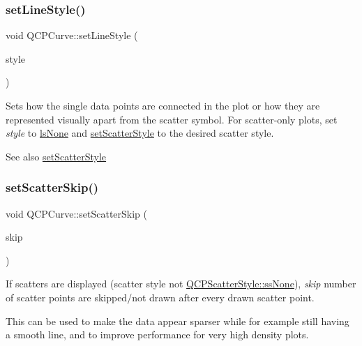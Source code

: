 \subsubsection{\texorpdfstring{set\+Line\+Style()}{setLineStyle()}}
{\footnotesize\ttfamily void Q\+C\+P\+Curve\+::set\+Line\+Style (\begin{DoxyParamCaption}\item[{\mbox{\hyperlink{class_q_c_p_curve_a2710e9f79302152cff794c6e16cc01f1}{Q\+C\+P\+Curve\+::\+Line\+Style}}}]{style }\end{DoxyParamCaption})}

Sets how the single data points are connected in the plot or how they are represented visually apart from the scatter symbol. For scatter-\/only plots, set {\itshape style} to \mbox{\hyperlink{class_q_c_p_curve_a2710e9f79302152cff794c6e16cc01f1aec1601a191cdf0b4e761c4c66092cc48}{ls\+None}} and \mbox{\hyperlink{class_q_c_p_curve_a55e43b44709bf50a35500644988aa706}{set\+Scatter\+Style}} to the desired scatter style.

\begin{DoxySeeAlso}{See also}
\mbox{\hyperlink{class_q_c_p_curve_a55e43b44709bf50a35500644988aa706}{set\+Scatter\+Style}} 
\end{DoxySeeAlso}
\mbox{\label{class_q_c_p_curve_a97dbfecd497e972d5f2162615e6da5be}} 
\subsubsection{\texorpdfstring{set\+Scatter\+Skip()}{setScatterSkip()}}
{\footnotesize\ttfamily void Q\+C\+P\+Curve\+::set\+Scatter\+Skip (\begin{DoxyParamCaption}\item[{int}]{skip }\end{DoxyParamCaption})}

If scatters are displayed (scatter style not \mbox{\hyperlink{class_q_c_p_scatter_style_adb31525af6b680e6f1b7472e43859349abd144c291ca274f77053ec68cab6c022}{Q\+C\+P\+Scatter\+Style\+::ss\+None}}), {\itshape skip} number of scatter points are skipped/not drawn after every drawn scatter point.

This can be used to make the data appear sparser while for example still having a smooth line, and to improve performance for very high density plots.

